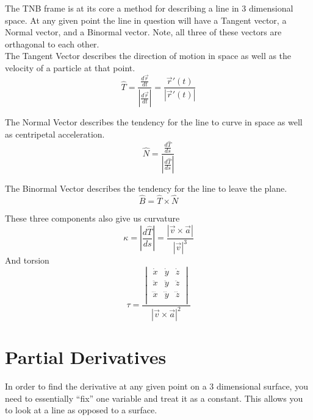 \documentclass{article}
\newcommand{\abs}[1]{\left\lvert #1 \right\rvert}
\begin{document}
The TNB frame is at its core a method for describing a line in 3 dimensional space. At any given point the line in question will have a Tangent vector, a Normal vector, and a Binormal vector. Note, all three of these vectors are orthagonal to each other.\\

The Tangent Vector describes the direction of motion in space as well as the velocity of a particle at that point.
\begin{equation}
\hat{T} = \frac{\frac{d\vec{r} }{dt} }{\abs{\frac{d\vec{r} }{dt} } } =
\frac{\vec{r}\prime(t)}{\abs{\vec{r}\prime(t)} }
\end{equation}

The Normal Vector describes the tendency for the line to curve in space as well as centripetal acceleration.
\begin{equation}
\hat{N} = \frac{\frac{d\hat{T} }{ds} }{\abs{\frac{d\hat{T} }{ds} } }
\end{equation}

The Binormal Vector describes the tendency for the line to leave the plane.
\begin{equation}
\hat{B} = \hat{T} \times \hat{N}
\end{equation}

These three components also give us curvature
\begin{equation}
\kappa = \abs{\frac{d\hat{T} }{ds} } = \frac{\abs{\vec{v}\times\vec{a} } }{\abs{\vec{v} }^3}
\end{equation}
\indent And torsion
\begin{equation}
\tau = \frac{
    \begin{vmatrix}
    \dot{x} & \dot{y} & \dot{z}\\
    \ddot{x} & \ddot{y} & \ddot{z}\\
    \dddot{x} & \dddot{y} & \dddot{z}\\
    \end{vmatrix}
}{\abs{\vec{v}\times\vec{a} }^2}
\end{equation}

\section{Partial Derivatives}
In order to find the derivative at any given point on a 3 dimensional surface, you need to essentially ``fix'' one variable and treat it as a constant. This allows you to look at a line as opposed to a surface.
\end{document}

